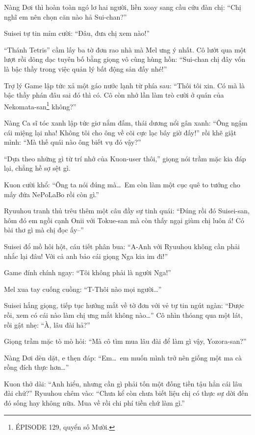 \documentclass[../main.tex]{subfiles}
\begin{document}
Nàng Dơi thì hoàn toàn ngó lơ hai người, liền xoay sang cầu cứu đàn chị: ``Chị nghĩ em nên chọn căn nào hả Sui-chan?''

Suisei tự tin mỉm cười: ``Đâu, đưa chị xem nào!''

``Thánh Tetris'' cầm lấy ba tờ đơn rao nhà mà Mel ưng ý nhất. Cô lướt qua một lượt rồi dõng dạc tuyên bố bằng giọng vô cùng hùng hồn: ``Sui-chan chị đây vốn là bậc thầy trong việc quản lý bất động sản đấy nhé!''


Trợ lý Game lập tức xả một gáo nước lạnh từ phía sau: ``Thôi tôi xin. Có mà là bậc thầy phán đâu sai đó thì có. Cô còn nhớ lần làm trò cười ở quán của Nekomata-san\footnote{{\flaregothic ÉPISODE 129}, quyển số Mười.} không?''

Nàng Ca sĩ tóc xanh lập tức giơ nắm đấm, thái dương nổi gân xanh: ``Ông ngậm cái miệng lại nha! Không tôi cho ông về cõi cực lạc bây giờ đấy!'' rồi khẽ giật mình: ``Mà thế quái nào ông biết vụ đó vậy?''

``Dựa theo những gì từ trí nhớ của Kuon-user thôi,'' giọng nói trầm mặc kia đáp lại, chẳng hề sợ sệt gì.

Kuon cười khổ: ``Ông ta nói đúng mà\dots\ Em còn làm một cục quê to tướng cho mấy đứa NePoLaBo rồi còn gì.''

Ryuuhou tranh thủ trêu thêm một câu đầy sự tinh quái: ``Đúng rồi đó Suisei-san, hôm đó em ngồi cạnh Onii với Tokue-san mà còn thấy ngại giùm chị luôn á! Có bài thơ gì mà chị đọc ấy--''

Suisei đổ mồ hôi hột, cáu tiết phân bua: ``A-Anh với Ryuuhou không cần phải nhắc lại đâu! Với cả anh bảo cái giọng Nga kia im đi!''

Game đính chính ngay: ``Tôi không phải là người Nga!''

Mel xua tay cuống cuồng: ``T-Thôi nào mọi người\dots''

Suisei hắng giọng, tiếp tục hướng mắt về tờ đơn với vẻ tự tin ngút ngàn: ``Được rồi, xem có cái nào làm chị ưng mắt không nào\dots'' Cô nhìn thóang qua một lát, rồi gật nhẹ: ``À, lâu đài hả?''

Giọng trầm mặc tò mò hỏi: ``Mà cô tìm mua lâu đài để làm gì vậy, Yozora-san?''

Nàng Dơi dèn dặt, e thẹn đáp: ``Em\dots\ em muốn mình trở nên giống một ma cà rồng đích thực hơn\dots''

Kuon thở dài: ``Anh hiểu, nhưng cần gì phải tốn một đống tiền tậu hẳn cái lâu đài chứ?'' Ryuuhou chêm vào: ``Chưa kể còn chưa biết liệu chị có thực sự dời đến đó sống hay không nữa. Mua về rồi chi phí tiền chứ làm gì.''
\end{document}
